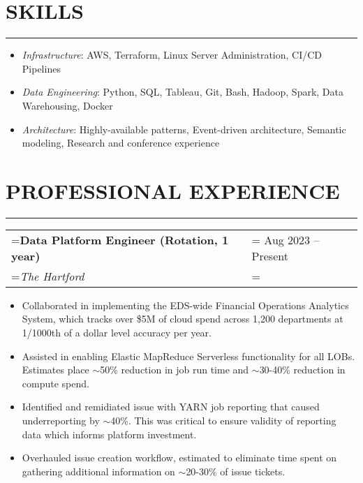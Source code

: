 \documentclass{article}
\begin{document}
\section*{\normalsize{SKILLS}}
\vspace{-1.8em}
\noindent\rule{\textwidth}{.5pt}
\begin{itemize}[label={}, leftmargin=1em]
    \setlength\itemsep{0em}
    \item \textit{Infrastructure}: AWS, Terraform, Linux Server Administration, CI/CD Pipelines
    \item \textit{Data Engineering}: Python, SQL, Tableau, Git, Bash, Hadoop, Spark, Data Warehousing, Docker
    \item \textit{Architecture}: Highly-available patterns, Event-driven architecture, Semantic modeling, Research and conference experience 
\end{itemize}


\section*{\normalsize{PROFESSIONAL EXPERIENCE}}
\vspace{-1.8em}
\noindent\rule{\textwidth}{.5pt}

\vspace{.5em}
\hspace{-1em}
\begin{tabularx}{\textwidth}{
    >{\raggedright\arraybackslash\hsize=1\hsize\linewidth=\hsize}X
    >{\raggedleft\arraybackslash\hsize=1\hsize\linewidth=\hsize}X }
    \textbf{Data Platform Engineer (Rotation, 1 year)} & Aug 2023 -- Present\\
    \textit{The Hartford} & \\
\end{tabularx}
\vspace{-.5em}
\begin{itemize}[label={--}, leftmargin=1em]
    \setlength\itemsep{0em}
    \item Collaborated in implementing the EDS-wide Financial Operations Analytics System, which tracks over \$5M of cloud spend across 1,200 departments at 1/1000th of a dollar level accuracy per year.
    \item Assisted in enabling Elastic MapReduce Serverless functionality for all LOBs. Estimates place $\sim$50\% reduction in job run time and $\sim$30-40\% reduction in compute spend.
    \item Identified and remidiated issue with YARN job reporting that caused underreporting by $\sim$40\%. This was critical to ensure validity of reporting data which informs platform investment.
    \item Overhauled issue creation workflow, estimated to eliminate time spent on gathering additional information on $\sim$20-30\% of issue tickets. 
\end{itemize}
\end{document}

